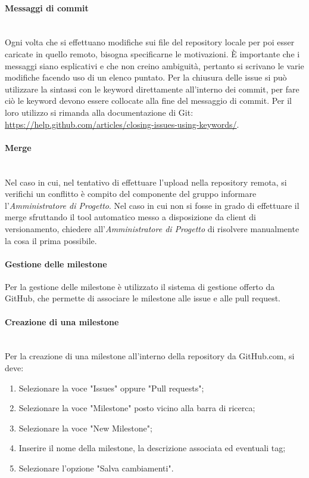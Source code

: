 {\paragraph{Messaggi di commit}\mbox{}\\
Ogni volta che si effettuano modifiche sui file del repository locale per poi esser caricate in
quello remoto, bisogna specificarne le motivazioni. \uppercase{è} importante che i messaggi siano esplicativi e che non creino ambiguità, pertanto si scrivano le varie modifiche facendo uso di un elenco puntato.
Per la chiusura delle issue si può utilizzare la sintassi con le {keyword} direttamente all'interno dei {commit}, per fare ciò le keyword devono essere collocate alla fine del messaggio di commit. Per il loro utilizzo si rimanda alla documentazione di {Git}: \url{https://help.github.com/articles/closing-issues-using-keywords/}. 

\paragraph{Merge}\mbox{}\\
Nel caso in cui, nel tentativo di effettuare l'upload nella repository remota, si verifichi un {conflitto} è compito del componente del gruppo informare l'\textit{Amministratore di Progetto}. Nel caso in cui non si fosse in grado di effettuare il {merge} sfruttando il tool automatico messo a disposizione da client di versionamento, chiedere all'\textit{Amministratore di Progetto} di risolvere manualmente la cosa il prima possibile.
\paragraph{Gestione delle milestone}
Per la gestione delle {milestone} è utilizzato il sistema di gestione offerto da GitHub, che permette di associare le milestone alle issue e alle pull request.
\paragraph{Creazione di una milestone}\mbox{}\\
Per la creazione di una milestone all'interno della repository da GitHub.com, si deve:
\begin{enumerate}
\item Selezionare la voce "Issues" oppure "Pull requests";
\item Selezionare la voce "Milestone" posto vicino alla barra di ricerca;
\item Selezionare la voce "New Milestone";
\item Inserire il nome della milestone, la descrizione associata ed eventuali tag;
\item Selezionare l'opzione "Salva cambiamenti".
\end{enumerate}
}
